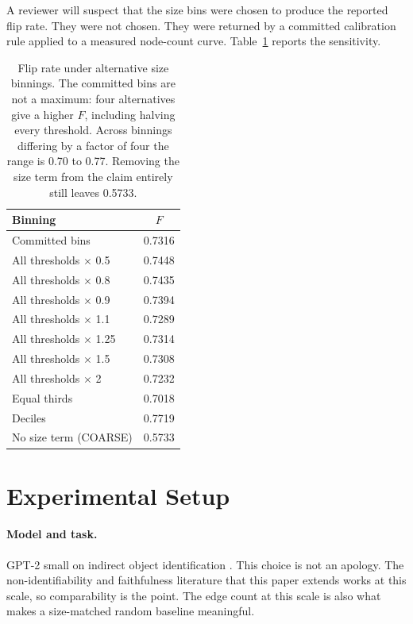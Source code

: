\documentclass[letterpaper]{article} %
\begin{document}
A reviewer will suspect that the size bins were chosen to produce the reported
flip rate. They were not chosen. They were returned by a committed calibration
rule applied to a measured node-count curve. Table~\ref{tab:bins} reports the
sensitivity.

\begin{table}[t]
\centering
\caption{Flip rate under alternative size binnings. The committed bins are not a
maximum: four alternatives give a higher $F$, including halving every threshold.
Across binnings differing by a factor of four the range is 0.70 to 0.77.
Removing the size term from the claim entirely still leaves 0.5733.}
\label{tab:bins}
\begin{tabular}{lc}
\toprule
Binning & $F$ \\
\midrule
Committed bins & 0.7316 \\
All thresholds $\times$ 0.5 & 0.7448 \\
All thresholds $\times$ 0.8 & 0.7435 \\
All thresholds $\times$ 0.9 & 0.7394 \\
All thresholds $\times$ 1.1 & 0.7289 \\
All thresholds $\times$ 1.25 & 0.7314 \\
All thresholds $\times$ 1.5 & 0.7308 \\
All thresholds $\times$ 2 & 0.7232 \\
Equal thirds & 0.7018 \\
Deciles & 0.7719 \\
No size term (COARSE) & 0.5733 \\
\bottomrule
\end{tabular}
\end{table}

\section{Experimental Setup}

\paragraph{Model and task.}
GPT-2 small on indirect object identification \citep{wang2022}. This choice is
not an apology. The non-identifiability and faithfulness literature that this
paper extends works at this scale, so comparability is the point. The edge count
at this scale is also what makes a size-matched random baseline meaningful.
\end{document}
